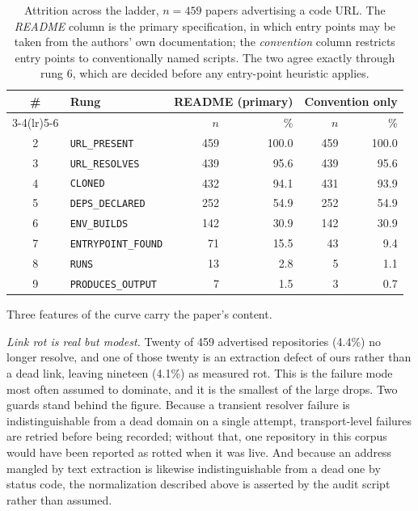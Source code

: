 \begin{table}[H]
\centering
\caption{Attrition across the ladder, $n=459$ papers advertising a code URL.
The \emph{README} column is the primary specification, in which entry points may
be taken from the authors' own documentation; the \emph{convention} column
restricts entry points to conventionally named scripts. The two agree exactly
through rung 6, which are decided before any entry-point heuristic applies.}
\label{tab:attrition}
\small
\begin{tabular}{@{}clrrrr@{}}
\toprule
\# & Rung & \multicolumn{2}{c}{README (primary)} & \multicolumn{2}{c}{Convention only} \\
\cmidrule(lr){3-4}\cmidrule(lr){5-6}
   &      & $n$ & \% & $n$ & \% \\
\midrule
2  & \texttt{URL\_PRESENT}       & 459 & 100.0 & 459 & 100.0 \\
3  & \texttt{URL\_RESOLVES}      & 439 & 95.6  & 439 & 95.6 \\
4  & \texttt{CLONED}             & 432 & 94.1  & 431 & 93.9 \\
5  & \texttt{DEPS\_DECLARED}     & 252 & 54.9  & 252 & 54.9 \\
6  & \texttt{ENV\_BUILDS}        & 142 & 30.9  & 142 & 30.9 \\
7  & \texttt{ENTRYPOINT\_FOUND}  & 71  & 15.5  & 43  & 9.4 \\
8  & \texttt{RUNS}               & 13  & 2.8   & 5   & 1.1 \\
9  & \texttt{PRODUCES\_OUTPUT}   & 7   & 1.5   & 3   & 0.7 \\
\bottomrule
\end{tabular}
\end{table}

Three features of the curve carry the paper's content.

\emph{Link rot is real but modest.} Twenty of 459 advertised repositories
(4.4\%) no longer resolve, and one of those twenty is an extraction defect of
ours rather than a dead link, leaving nineteen (4.1\%) as measured rot. This is
the failure mode most often assumed to dominate, and it is the smallest of the
large drops. Two guards stand behind the figure. Because a transient resolver
failure is indistinguishable from a dead domain on a single attempt,
transport-level failures are retried before being recorded; without that, one
repository in this corpus would have been reported as rotted when it was live.
And because an address mangled by text extraction is likewise indistinguishable
from a dead one by status code, the normalization described above is asserted by
the audit script rather than assumed.

